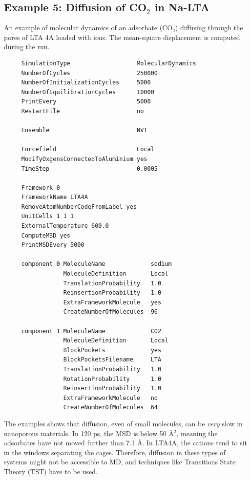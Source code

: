 \subsection*{Example 5: Diffusion of CO$_2$ in Na-LTA}

An example of molecular dynamics of an adsorbate (CO$_2$) diffusing through the pores of LTA 4A loaded with ions.
The mean-square displacement is computed during the run.

\begin{tiny}
\begin{verbatim}
     SimulationType                   MolecularDynamics
     NumberOfCycles                   250000
     NumberOfInitializationCycles     5000
     NumberOfEquilibrationCycles      10000
     PrintEvery                       5000
     RestartFile                      no
     
     Ensemble                         NVT
     
     Forcefield                       Local
     ModifyOxgensConnectedToAluminium yes
     TimeStep                         0.0005
     
     Framework 0
     FrameworkName LTA4A
     RemoveAtomNumberCodeFromLabel yes
     UnitCells 1 1 1
     ExternalTemperature 600.0
     ComputeMSD yes
     PrintMSDEvery 5000
     
     component 0 MoleculeName             sodium
                 MoleculeDefinition       Local
                 TranslationProbability   1.0
                 ReinsertionProbability   1.0
                 ExtraFrameworkMolecule   yes
                 CreateNumberOfMolecules  96
     
     component 1 MoleculeName             CO2
                 MoleculeDefinition       Local
                 BlockPockets             yes
                 BlockPocketsFilename     LTA
                 TranslationProbability   1.0
                 RotationProbability      1.0
                 ReinsertionProbability   1.0
                 ExtraFrameworkMolecule   no
                 CreateNumberOfMolecules  64
\end{verbatim}
\end{tiny}

\noindent
The examples shows that diffusion, even of small molecules, can be \emph{very} slow in nanoporous materials.
In 120 ps, the MSD is below 50 \AA$^2$, meaning the adsorbates have not moved further than 7.1 \AA.
In LTA4A, the cations tend to sit in the windows separating the cages.
Therefore, diffusion in these types of systems might not be accessible to MD, and techniques like Transitions State Theory (TST)
have to be used.

